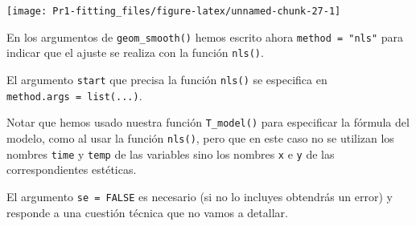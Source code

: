 \documentclass[
  degree=mecinf,
  title=normal,
  toc=normal,
  bib=normal]{mnye}
\begin{document}
\begin{center}\texttt{[image: Pr1-fitting\_files/figure-latex/unnamed-chunk-27-1]} \end{center}

En los argumentos de \texttt{geom\_smooth()} hemos escrito ahora \texttt{method\ =\ "nls"} para indicar que el ajuste se realiza con la función \texttt{nls()}.

El argumento \texttt{start} que precisa la función \texttt{nls()} se especifica en \texttt{method.args\ =\ list(...)}.

Notar que hemos usado nuestra función \texttt{T\_model()} para especificar la fórmula del modelo, como al usar la función \texttt{nls()}, pero que en este caso no se utilizan los nombres \texttt{time} y \texttt{temp} de las variables sino los nombres \texttt{x} e \texttt{y} de las correspondientes estéticas.

El argumento \texttt{se\ =\ FALSE} es necesario (si no lo incluyes obtendrás un error) y responde a una cuestión técnica que no vamos a detallar.

\end{document}

